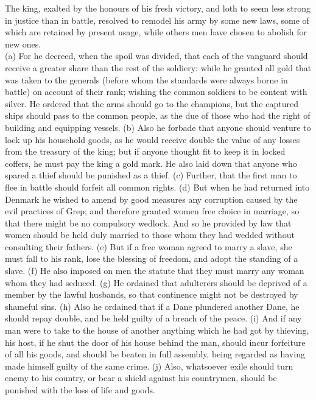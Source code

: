 \documentclass[10pt,a4paper]{report}
\begin{document}
The king, exalted by the honours of his fresh victory, and loth to seem less strong in justice than in battle, resolved to remodel his army by some new laws, some of which are retained by present usage, while others men have chosen to abolish for new ones.\\
\indent (a) For he decreed, when the spoil was divided, that each of the vanguard should receive a greater share than the rest of the soldiery: while he granted all gold that was taken to the generals (before whom the standards were always borne in battle) on account of their rank; wishing the common soldiers to be content with silver. He ordered that the arms should go to the champions, but the captured ships should pass to the common people, as the due of those who had the right of building and equipping vessels.
\indent (b) Also he forbade that anyone should venture to lock up his household goods, as he would receive double the value of any losses from the treasury of the king; but if anyone thought fit to keep it in locked coffers, he must pay the king a gold mark. He also laid down that anyone who spared a thief should be punished as a thief.
\indent (c) Further, that the first man to flee in battle should forfeit all common rights.
\indent (d) But when he had returned into Denmark he wished to amend by good measures any corruption caused by the evil practices of Grep; and therefore granted women free choice in marriage, so that there might be no compulsory wedlock. And so he provided by law that women should be held duly married to those whom they had wedded without consulting their fathers.
\indent (e) But if a free woman agreed to marry a slave, she must fall to his rank, lose the blessing of freedom, and adopt the standing of a slave.
\indent (f) He also imposed on men the statute that they must marry any woman whom they had seduced.
\indent (g) He ordained that adulterers should be deprived of a member by the lawful husbands, so that continence might not be destroyed by shameful sins.
\indent (h) Also he ordained that if a Dane plundered another Dane, he should repay double, and be held guilty of a breach of the peace.
\indent (i) And if any man were to take to the house of another anything which he had got by thieving, his host, if he shut the door of his house behind the man, should incur forfeiture of all his goods, and should be beaten in full assembly, being regarded as having made himself guilty of the same crime.
\indent (j) Also, whatsoever exile should turn enemy to his country, or bear a shield against his countrymen, should be punished with the loss of life and goods.
\end{document}
